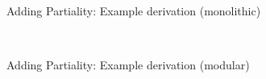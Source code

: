 \documentclass[main]{subfiles}
\begin{document}
\begin{frame}[fragile]{Adding Partiality: Example derivation (monolithic)}
\begin{code}
\<%
\\
%
\>[10]\AgdaSpace{}%
\AgdaSpace{}%
\AgdaSpace{}%
\AgdaSpace{}%
\AgdaSpace{}%
\AgdaSpace{}%
\AgdaSpace{}%
\AgdaSpace{}%
\AgdaSpace{}%
\AgdaSpace{}%
\AgdaSpace{}%
\AgdaSpace{}%
\AgdaSpace{}%
\AgdaSpace{}%
%
\>[42]\<%
\end{code}
\end{frame}
\begin{frame}[fragile]{Adding Partiality: Example derivation (modular)}
\begin{code}%
\>[0]\AgdaFunction{\AgdaUnderscore{}}\AgdaSpace{}%
\AgdaSymbol{:}\AgdaSpace{}%
\AgdaSpace{}%
\AgdaSpace{}%
\AgdaSpace{}%
\AgdaSpace{}%
\AgdaSpace{}%
\AgdaSpace{}%
\AgdaSpace{}%
\AgdaSpace{}%
\AgdaSpace{}%
\AgdaSpace{}%
\AgdaSpace{}%
\AgdaSpace{}%
\AgdaSpace{}%
\AgdaSpace{}%
\AgdaSpace{}%
\AgdaSpace{}%
\AgdaSpace{}%
\AgdaSpace{}%
\AgdaSpace{}%
\AgdaSpace{}%
\AgdaSpace{}%
\AgdaSpace{}%
\AgdaSpace{}%
\AgdaSpace{}%
\AgdaSpace{}%
\AgdaSpace{}%
\AgdaSpace{}%
\AgdaSpace{}%
\AgdaSpace{}%
\AgdaSpace{}%
\AgdaSpace{}%
\AgdaSpace{}%
\AgdaSpace{}%
\AgdaSpace{}%
\<%
\\
\>[0]\AgdaSymbol{\AgdaUnderscore{}}%
\>[516I]\AgdaSymbol{=}\AgdaSpace{}%
%

\end{code}
\end{frame}
\end{document}
